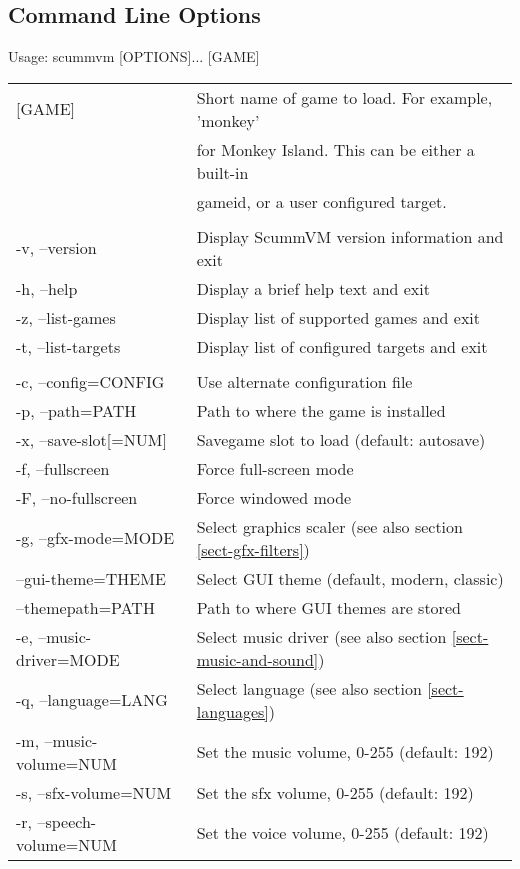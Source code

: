 \subsection{Command Line Options}

Usage: scummvm [OPTIONS]... [GAME]\\
\begin{tabular}{ll}
  [GAME]                  &Short name of game to load. For example, 'monkey'\\
                          &for Monkey Island. This can be either a built-in\\
                          &gameid, or a user configured target.\\
\\
  -v, --version           &Display ScummVM version information and exit\\
  -h, --help              &Display a brief help text and exit\\
  -z, --list-games        &Display list of supported games and exit\\
  -t, --list-targets      &Display list of configured targets and exit\\
\\
  -c, --config=CONFIG     &Use alternate configuration file\\
  -p, --path=PATH         &Path to where the game is installed\\
  -x, --save-slot[=NUM]   &Savegame slot to load (default: autosave)\\
  -f, --fullscreen        &Force full-screen mode\\
  -F, --no-fullscreen     &Force windowed mode\\
  -g, --gfx-mode=MODE     &Select graphics scaler (see also section \ref{sect-gfx-filters})\\
  --gui-theme=THEME       &Select GUI theme (default, modern, classic)\\
  --themepath=PATH        &Path to where GUI themes are stored\\
  -e, --music-driver=MODE &Select music driver (see also section \ref{sect-music-and-sound})\\
  -q, --language=LANG     &Select language (see also section \ref{sect-languages})\\
  -m, --music-volume=NUM  &Set the music volume, 0-255 (default: 192)\\
  -s, --sfx-volume=NUM    &Set the sfx volume, 0-255 (default: 192)\\
  -r, --speech-volume=NUM &Set the voice volume, 0-255 (default: 192)\\

\end{tabular}
